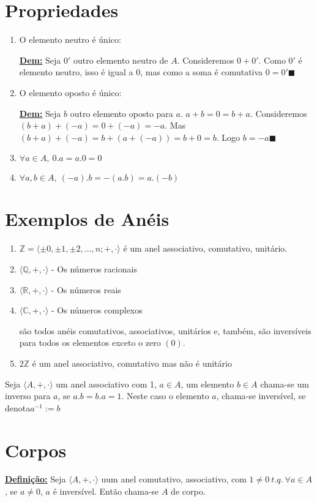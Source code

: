 \documentclass[12pt]{book}
\newcommand{\integer}{\mathbb{Z}}
\newcommand{\real}{\mathbb{R}}
\newcommand{\mytitle}[1]{\textbf{\underline{#1}}}
\newcommand{\ring}[1]{\langle #1 \rangle}
\begin{document}
\section{Propriedades}
\begin{enumerate}
\item O elemento neutro é único:

  \mytitle{Dem:} Seja $0'$ outro elemento neutro de $A$. Consideremos $0+0'$. Como $0'$ é elemento neutro, isso é igual a $0$, mas como a soma é comutativa $0=0' \blacksquare$
\item O elemento oposto é único:

  \mytitle{Dem:} Seja $b$ outro elemento oposto para $a$. $a+b=0=b+a$. Consideremos $(b+a)+(-a)=0+(-a)=-a$. Mas $(b+a)+(-a)=b+(a+(-a))=b+0=b$. Logo $b=-a \blacksquare$ 
\item $\forall a \in A,\: 0.a=a.0=0$
\item $\forall a,b \in A,\: (-a).b=-(a.b)=a.(-b)$
\end{enumerate}
\section{Exemplos de Anéis}
\begin{enumerate}
\item $\integer=\ring{\pm 0,\pm 1,\pm 2,\dots,n;+,\cdot}$ é um anel associativo, comutativo, unitário.
\item $\ring{\mathbb{Q},+,\cdot}$ - Os números racionais
\item $\ring{\real,+,\cdot}$ - Os números reais
\item $\ring{\mathbb{C},+,\cdot}$ - Os números complexos

  são todos anéis comutativos, associativos, unitários e, também, são inversíveis para todos os elementos exceto o zero $(0)$.
\item $2\integer$ é um anel associativo, comutativo mas não é unitário
\end{enumerate}
Seja $\ring{A,+,\cdot}$ um anel associativo com 1, $a \in A$, um elemento $b \in A$ chama-se um inverso para $a$, se $a.b=b.a=1$. Neste caso o elemento $a$, chama-se inversível,  se denota$a^{-1}:=b$
\section{Corpos}
\mytitle{Definição:} Seja $\ring{A,+,\cdot}$ uum anel comutativo, associativo, com $1\neq 0\: t.q. \: \forall a \in A$, se $a\neq 0$, $a$ é inversível. Então chama-se $A$ de corpo.
\end{document}
